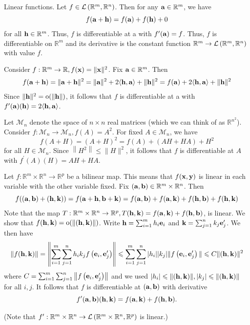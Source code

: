\documentclass[a4paper]{article}
\begin{document}
\begin{example}
    Linear functions. Let $f \in {\mathcal{L}}\left(\mathbb{R}^{m}, \mathbb{R}^{n}\right)$. Then for any ${\bf a} \in \mathbb{R}^{m}$, we have
    $$
f({\bf a}+{\bf h})=f({\bf a})+f({\bf h})+0
$$
for all ${\bf h} \in \mathbb{R}^{m}$. Thus, $f$ is differentiable at a with $f^{\prime}({\bf a})=f$. Thus, $f$ is differentiable on $\mathbb{R}^{m}$ and its derivative is the constant function $\mathbb{R}^{m} \rightarrow {\mathcal{L}}\left(\mathbb{R}^{m}, \mathbb{R}^{n}\right)$ with value $f$.
\end{example}
\begin{example}
    Consider $f: \mathbb{R}^{m} \rightarrow \mathbb{R}, f({\bf x})=\|{\bf x}\|^{2}$. Fix ${\bf a} \in \mathbb{R}^{m}$. Then
    $$
f({\bf a}+{\bf h})=\|{\bf a}+{\bf h}\|^{2}=\|{\bf a}\|^{2}+2\langle {\bf h}, {\bf a}\rangle+\|{\bf h}\|^{2}=f({\bf a})+2\langle {\bf h}, {\bf a}\rangle+\|{\bf h}\|^{2}
$$
Since $\|{\bf h}\|^{2}=\mathrm{o}(\|{\bf h}\|)$, it follows that $f$ is differentiable at a with $f^{\prime}({\bf a})({\bf h})=2\langle {\bf h}, {\bf a}\rangle$.
\end{example}

\begin{example}
    Let $\mathcal{M}_{n}$ denote the space of $n \times n$ real matrices (which we can think of as $\mathbb{R}^{n^{2}}$). Consider $f: \mathcal{M}_{n} \rightarrow \mathcal{M}_{n}, f(A)=A^{2}$. For fixed $A \in \mathcal{M}_{n}$, we have
$$
f(A+H)=(A+H)^{2}=f(A)+(A H+H A)+H^{2}
$$
for all $H \in \mathcal{M}_{n}$. Since $\left\|H^{2}\right\| \leqslant\|H\|^{2}$, it follows that $f$ is differentiable at $A$ with $f^{\prime}(A)(H)=A H+H A$.
\end{example}

\begin{example}
    Let $f: \mathbb{R}^{m} \times \mathbb{R}^{n} \rightarrow \mathbb{R}^{p}$ be a bilinear map. This means that $f({\bf x}, {\bf y})$ is linear in each variable with the other variable fixed. Fix $({\bf a}, {\bf b}) \in \mathbb{R}^{m} \times \mathbb{R}^{n}$. Then
    $$
f(({\bf a}, {\bf b})+({\bf h}, {\bf k}))=f({\bf a}+{\bf h}, {\bf b}+{\bf k})=f({\bf a}, {\bf b})+f({\bf a}, {\bf k})+f({\bf h}, {\bf b})+f({\bf h}, {\bf k})
$$
Note that the map $T: \mathbb{R}^{m} \times \mathbb{R}^{n} \rightarrow \mathbb{R}^{p}, T({\bf h}, {\bf k})=f({\bf a}, {\bf k})+f({\bf h}, {\bf b})$, is linear. We show that $f({\bf h}, {\bf k})=\mathrm{o}(\|({\bf h}, {\bf k})\|)$. Write ${\bf h}=\sum_{i=1}^{m} h_{i} {\bf e}_{i}$ and ${\bf k}=\sum_{j=1}^{n} k_{j} {\bf e}_{j}^{\prime}$. We then have
$$
\|f({\bf h}, {\bf k})\|=\left\|\sum_{i=1}^{m} \sum_{j=1}^{n} h_{i} k_{j} f\left({\bf e}_{i}, {\bf e}_{j}^{\prime}\right)\right\| \leqslant \sum_{i=1}^{m} \sum_{j=1}^{n} | h_{i}| |k_{j}| \|f\left({\bf e}_{i}, {\bf e}_{j}^{\prime}\right)\|\leqslant C\|({\bf h}, {\bf k}) \|^{2}
$$
where $C=\sum_{i=1}^{m} \sum_{j=1}^{n}\left\|f\left({\bf e}_{i}, {\bf e}_{j}^{\prime}\right)\right\|$ and we used $\left|h_{i}\right| \leqslant\|({\bf h}, {\bf k})\|,\left|k_{j}\right| \leqslant\|({\bf h}, {\bf k})\|$ for all $i, j$. It follows that $f$ is differentiable at $({\bf a}, {\bf b})$ with derivative 
\[
    f^{\prime}({\bf a}, {\bf b})({\bf h}, {\bf k})=f({\bf a}, {\bf k})+f({\bf h}, {\bf b}).
\]

(Note that $f^{\prime}: \mathbb{R}^{m} \times \mathbb{R}^{n} \rightarrow {\mathcal{L}}\left(\mathbb{R}^{m} \times \mathbb{R}^{n}, \mathbb{R}^{p}\right)$ is linear.)
\end{example}
\end{document}
